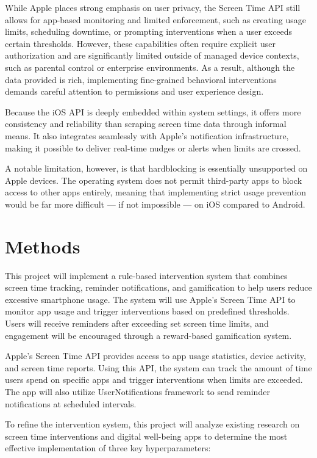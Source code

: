 \documentclass[10pt,twocolumn]{article}
\begin{document}
While Apple places strong emphasis on user privacy, the Screen Time API still allows for app-based monitoring and limited enforcement, such as creating usage limits, scheduling downtime, or prompting interventions when a user exceeds certain thresholds. However, these capabilities often require explicit user authorization and are significantly limited outside of managed device contexts, such as parental control or enterprise environments. As a result, although the data provided is rich, implementing fine-grained behavioral interventions demands careful attention to permissions and user experience design.

Because the iOS API is deeply embedded within system settings, it offers more consistency and reliability than scraping screen time data through informal means. It also integrates seamlessly with Apple’s notification infrastructure, making it possible to deliver real-time nudges or alerts when limits are crossed.\cite{ScreenTimeTeens}

A notable limitation, however, is that hardblocking is essentially unsupported on Apple devices. The operating system does not permit third-party apps to block access to other apps entirely, meaning that implementing strict usage prevention would be far more difficult — if not impossible — on iOS compared to Android.

\section{Methods}

This project will implement a rule-based intervention system that combines screen time tracking, reminder notifications, and gamification to help users reduce excessive smartphone usage. The system will use Apple’s Screen Time API to monitor app usage and trigger interventions based on predefined thresholds. Users will receive reminders after exceeding set screen time limits, and engagement will be encouraged through a reward-based gamification system.

Apple’s Screen Time API provides access to app usage statistics, device activity, and screen time reports. Using this API, the system can track the amount of time users spend on specific apps and trigger interventions when limits are exceeded. The app will also utilize UserNotifications framework to send reminder notifications at scheduled intervals. \cite{ScreenTimeAnxiety}

To refine the intervention system, this project will analyze existing research on screen time interventions and digital well-being apps to determine the most effective implementation of three key hyperparameters:
\end{document}
